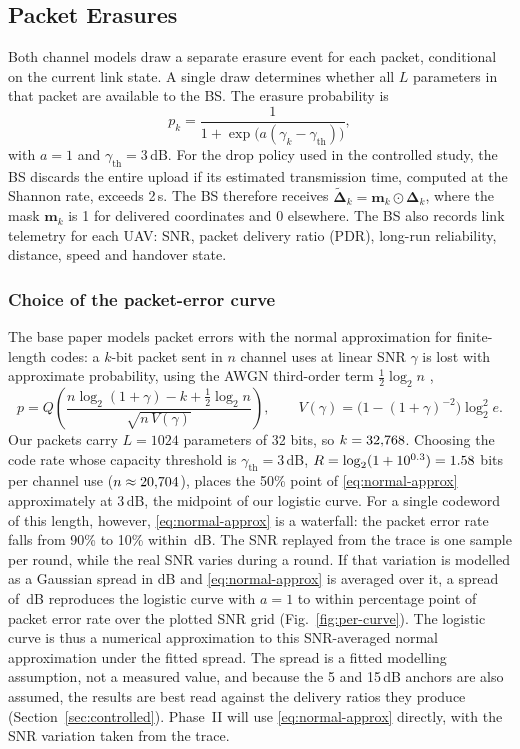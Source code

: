 \subsection{Packet Erasures}
Both channel models draw a separate erasure event for each packet, conditional on
the current link state. A single draw determines whether all $L$ parameters in
that packet are available to the BS. The erasure probability is
\begin{equation}
  p_k = \frac{1}{1+\exp\bigl(a(\gamma_k-\gamma_{\mathrm{th}})\bigr)},
\end{equation}
with $a=1$ and $\gamma_{\mathrm{th}}=3$\,dB. For the drop policy used in the controlled study, the BS discards the entire
upload if its estimated transmission time, computed at the Shannon rate, exceeds
2\,s. The BS
therefore receives $\tilde{\boldsymbol\Delta}_k=\mathbf{m}_k\odot\boldsymbol\Delta_k$,
where the mask $\mathbf{m}_k$ is 1 for delivered coordinates and 0 elsewhere. The BS
also records link telemetry for each UAV: SNR, packet delivery ratio (PDR), long-run
reliability, distance, speed and handover state.

\subsubsection{Choice of the packet-error curve}
The base paper \cite{shirvanimoghaddam2022erroneous} models packet errors with the
normal approximation for finite-length codes: a $k$-bit packet sent in $n$ channel
uses at linear SNR $\gamma$ is lost with approximate probability, using the
AWGN third-order term $\tfrac12\log_2 n$ \cite{polyanskiy2010finite},
\begin{equation}
  p = Q\!\left(\frac{n\log_2(1+\gamma)-k+\tfrac12\log_2 n}{\sqrt{n\,V(\gamma)}}\right),\qquad
  V(\gamma)=\bigl(1-(1+\gamma)^{-2}\bigr)\log_2^2 e .
  \label{eq:normal-approx}
\end{equation}
Our packets carry $L=1024$ parameters of 32 bits, so $k=32{,}768$. Choosing the code
rate whose capacity threshold is $\gamma_{\mathrm{th}}=3$\,dB, $R=\log_2(1+10^{0.3})
=1.58$ bits per channel use ($n\approx20{,}704$), places the 50\% point of
\eqref{eq:normal-approx} approximately at 3\,dB, the midpoint of our logistic curve.
For a single
codeword of this length, however, \eqref{eq:normal-approx} is a waterfall: the packet
error rate falls from 90\% to 10\% within \PerWaterfall\,dB. The SNR replayed from
the trace is one sample per round, while the real SNR varies during a round. If that
variation is modelled as a Gaussian spread in dB and \eqref{eq:normal-approx} is
averaged over it, a spread of \PerSpread\,dB reproduces the logistic curve with
$a=1$ to within \PerMaxGap{} percentage point of packet error rate over the plotted SNR grid
(Fig.~\ref{fig:per-curve}). The logistic curve is thus a numerical approximation to
this SNR-averaged normal approximation under the fitted spread. The spread is a fitted
modelling assumption, not a measured value, and because the 5 and 15\,dB anchors
are also assumed, the results are best read against the delivery ratios they produce
(Section~\ref{sec:controlled}). Phase~II will use \eqref{eq:normal-approx} directly,
with the SNR variation taken from the trace.

